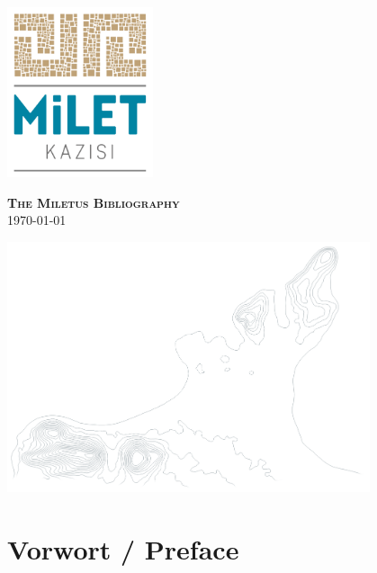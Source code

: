 
\begin{titlepage}
\vspace*{3cm}
\begin{center}
    \includegraphics[height=5cm]{../data/figures/milet-logo-tr}\\
    \vspace*{1cm}

    {\LARGE \textsc{\textbf{The Miletus Bibliography}}}\\

    \today\\
    \vspace*{2cm}

    \includegraphics[width=0.8\textwidth]{../data/figures/Gelaende2.png}
\end{center}

\end{titlepage}

\chapter{Vorwort / Preface}
\nocite{*}
\setcounter{page}{2}


